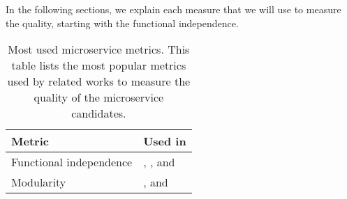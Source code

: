 In the following sections, we explain each measure that we will use to measure the quality, starting with the functional independence.

\begin{table}[h]
    \small
    \caption[Most used microservice metrics throughout related literature]{Most used microservice metrics. This table lists the most popular metrics used by related works to measure the quality of the microservice candidates.}\label{tab:ms_metrics}
    \begin{tabular}{>{\raggedright}m{120pt}>{\raggedright\arraybackslash}m{246pt}}
        \toprule
        Metric & Used in\\
        \midrule
        Functional independence & \citeauthor{al2021microservice} \cite{al2021microservice}, \citeauthor{brito2021identification} \cite{brito2021identification} \citeauthor{jin2018functionality} \cite{jin2018functionality}, \citeauthor{jin2019service} \cite{jin2019service} and \citeauthor{saidani2019towards} \cite{saidani2019towards}\\
        \midrule
        Modularity & \citeauthor{brito2021identification} \cite{brito2021identification}, \citeauthor{jin2019service} \cite{jin2019service} and \citeauthor{lohnertz2020steinmetz} \cite{lohnertz2020steinmetz}\\
        \bottomrule
    \end{tabular}
\end{table}

